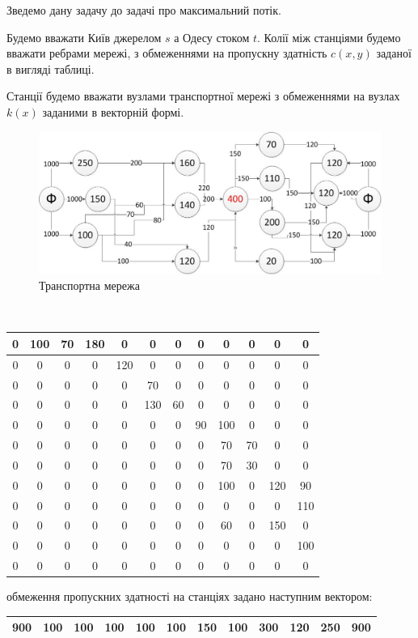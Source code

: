\documentclass[a4paper,14pt,russian,ukrainian,oneside,final]{extreport}
\begin{document}
\indent
Зведемо дану задачу до задачі про максимальний потік.
\par Будемо вважати Київ джерелом $s$ а Одесу стоком $t$. Колії між станціями будемо вважати ребрами мережі, з обмеженнями на пропускну здатність $c(x,y)$ заданої в вигляді таблиці.
\par Станції будемо вважати вузлами транспортної мережі з обмеженнями на вузлах $k(x)$ заданими в векторній формі.
\begin{figure}[h]
\begin{center}
\includegraphics[scale=0.65]{p2.jpg}
\caption{Транспортна мережа}
\end{center}
\end{figure}
\\
\begin{center}
\begin{tabular}{|c|c|c|c|c|c|c|c|c|c|c|c|}
\hline
0&100&70&180&0&0&0&0&0&0&0&0 \\ \hline
0&0&0&0&120&0&0&0&0&0&0&0 \\ \hline
0&0&0&0&0&70&0&0&0&0&0&0 \\ \hline
0&0&0&0&0&130&60&0&0&0&0&0 \\ \hline
0&0&0&0&0&0&0&90&100&0&0&0 \\ \hline
0&0&0&0&0&0&0&0&70&70&0&0 \\ \hline
0&0&0&0&0&0&0&0&70&30&0&0 \\ \hline
0&0&0&0&0&0&0&0&100&0&120&90 \\ \hline
0&0&0&0&0&0&0&0&0&0&0&110 \\ \hline
0&0&0&0&0&0&0&0&60&0&150&0 \\ \hline
0&0&0&0&0&0&0&0&0&0&0&100 \\ \hline
0&0&0&0&0&0&0&0&0&0&0&0 \\ \hline
\end{tabular}
\end{center}
обмеження пропускних здатності на станціях задано наступним вектором:
\begin{center}
\begin{tabular}{|c|c|c|c|c|c|c|c|c|c|c|c|}
\hline
900&100&100&100&100&100&150&100&300&120&250&900 \\
\hline
\end{tabular}
\end{center}
\end{document}
